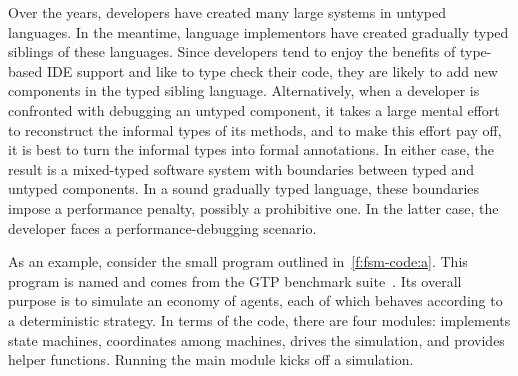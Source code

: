 
Over the years, developers have created many large systems in untyped languages.
In the meantime, language implementors have created gradually typed siblings of
these languages.  Since developers tend to enjoy the benefits of type-based IDE
support and like to type check their code, they are likely to add new components
in the typed sibling language. Alternatively, when a developer is confronted
with debugging an untyped component, it takes a large mental effort to
reconstruct the informal types of its methods, and to make this effort pay off,
it is best to turn the informal types into formal annotations. In either case,
the result is a mixed-typed software system with boundaries between typed and
untyped components. In a sound gradually typed language, these boundaries impose
a performance penalty, possibly a prohibitive one. In the latter case, the
developer faces a performance-debugging scenario.


As an example, consider the small program outlined in~\cref{f:fsm-code:a}.
This program is named  and comes from the GTP benchmark suite~\cite{gtp-benchmarks}.
Its overall purpose is to simulate an economy of agents, each of which behaves according to a
deterministic strategy.
In terms of the code, there are four modules:
 implements state machines,
 coordinates among machines,
 drives the simulation, and
 provides helper functions.
Running the main module kicks off a simulation.

